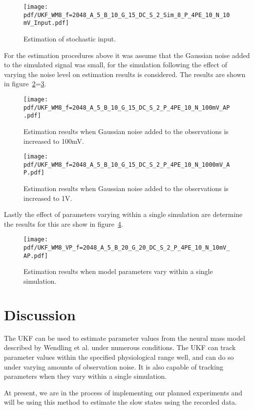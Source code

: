 \begin{figure}
	\centering
		\texttt{[image: pdf/UKF\_WM8\_f=2048\_A\_5\_B\_10\_G\_15\_DC\_S\_2\_Sim\_8\_P\_4PE\_10\_N\_10mV\_Input.pdf]}
	   \caption{Estimation of stochastic input.}
	\label{fig: UKFP4_2IN}
\end{figure}


For the estimation procedures above it was assume that the Gaussian noise added to the simulated signal was small, for the simulation following the effect of varying the noise level on estimation results is considered. The results are shown in figure~\ref{fig: UKFP4_N100}=\ref{fig: UKFP4_N1000}.

\begin{figure}
	\centering
		\texttt{[image: pdf/UKF\_WM8\_f=2048\_A\_5\_B\_10\_G\_15\_DC\_S\_2\_P\_4PE\_10\_N\_100mV\_AP.pdf]}
		\caption{Estimation results when Gaussian noise added to the observations is increased to 100mV.}
	\label{fig: UKFP4_N100}
\end{figure}

\begin{figure}
	\centering
		\texttt{[image: pdf/UKF\_WM8\_f=2048\_A\_5\_B\_10\_G\_15\_DC\_S\_2\_P\_4PE\_10\_N\_1000mV\_AP.pdf]}
				\caption{Estimation results when Gaussian noise added to the observations is increased to 1V.}
	\label{fig: UKFP4_N1000}
\end{figure}
 
Lastly the effect of parameters varying within a single simulation are determine the results for this are show in figure~\ref{fig: UKFVP}.

\begin{figure}
	\centering
		\texttt{[image: pdf/UKF\_WM8\_VP\_f=2048\_A\_5\_B\_20\_G\_20\_DC\_S\_2\_P\_4PE\_10\_N\_10mV\_AP.pdf]}
		\caption{Estimation results when model parameters vary within a single simulation.}
	\label{fig: UKFVP}
\end{figure}

\section{Discussion}

The UKF can be used to estimate parameter values from the neural mass model described by Wendling et al. under numerous conditions. The UKF can track parameter values within the specified physiological range well, and can do so under varying amounts of observation noise. It is also capable of tracking parameters when they vary within a single simulation.

At present, we are in the process of implementing our planned experiments and will be using this method to estimate the slow states using the recorded data.

